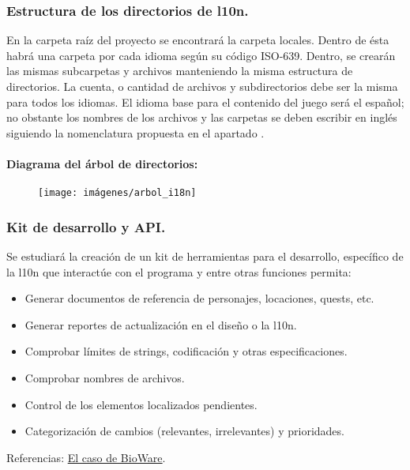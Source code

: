 \subsubsection{Estructura de los directorios de l10n.}
En la carpeta raíz del proyecto se encontrará la carpeta locales. Dentro de ésta habrá una carpeta por cada idioma según su código ISO-639. Dentro, se crearán las mismas subcarpetas y archivos manteniendo la misma estructura de directorios. La cuenta, o cantidad de archivos y subdirectorios debe ser la misma para todos los idiomas. El idioma base para el contenido del juego será el español; no obstante los nombres de los archivos y las carpetas se deben escribir en inglés siguiendo la nomenclatura propuesta en el apartado .

\paragraph{Diagrama del árbol de directorios:}\label{i18n:arbol-de-directorios}

\begin{figure}[H]
	\centering
	\texttt{[image: imágenes/arbol\_i18n]}
	\caption{}
	\label{fig:arbolinternacionalizacion}
\end{figure}

\subsubsection{Kit de desarrollo y API.}\label{i18n:toolkit-y-api}
Se estudiará la creación de un kit de herramientas para el desarrollo, específico de la l10n que interactúe con el programa y entre otras funciones permita:
\begin{itemize}
	\item Generar documentos de referencia de personajes, locaciones, quests, etc.
	\item Generar reportes de actualización en el diseño o la l10n.
	\item Comprobar límites de strings, codificación y otras especificaciones.
	\item Comprobar nombres de archivos.
	\item Control de los elementos localizados pendientes.
	\item Categorización de cambios (relevantes, irrelevantes) y prioridades.
\end{itemize}
Referencias: \href{https://drive.google.com/file/d/1OJxibGWbvxJq3_8WwmR93yzCCCvq7iu-/view?usp=sharing}{El caso de BioWare}.

